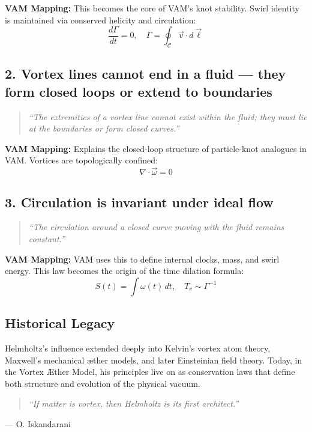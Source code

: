 \documentclass[preprint,notitlepage]{revtex4-2}
\begin{document}
    \textbf{VAM Mapping:} This becomes the core of VAM’s knot stability. Swirl identity is maintained via conserved helicity and circulation:
    \[
    \frac{d\Gamma}{dt} = 0, \quad \Gamma = \oint_{\mathcal{C}} \vec{v} \cdot d\vec{\ell}
    \]

    \subsection*{2. Vortex lines cannot end in a fluid — they form closed loops or extend to boundaries}
    \begin{quote}
    \textit{“The extremities of a vortex line cannot exist within the fluid; they must lie at the boundaries or form closed curves.”}
    \end{quote}

    \textbf{VAM Mapping:} Explains the closed-loop structure of particle-knot analogues in VAM. Vortices are topologically confined:
    \[
    \nabla \cdot \vec{\omega} = 0
    \]

    \subsection*{3. Circulation is invariant under ideal flow}
    \begin{quote}
    \textit{“The circulation around a closed curve moving with the fluid remains constant.”}
    \end{quote}

    \textbf{VAM Mapping:} VAM uses this to define internal clocks, mass, and swirl energy. This law becomes the origin of the time dilation formula:
    \[
    S(t) = \int \omega(t) \, dt, \quad T_v \sim \Gamma^{-1}
    \]

    \subsection*{Historical Legacy}

    Helmholtz's influence extended deeply into Kelvin’s vortex atom theory, Maxwell’s mechanical æther models, and later Einsteinian field theory. Today, in the Vortex Æther Model, his principles live on as conservation laws that define both structure and evolution of the physical vacuum.

    \begin{quote}
    \textit{“If matter is vortex, then Helmholtz is its first architect.”}
    \end{quote}
   \hfill — O. Iskandarani
\end{document}
